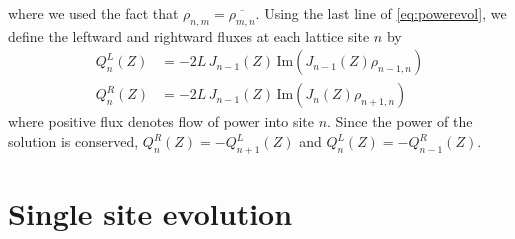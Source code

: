 \documentclass[reprint, amsmath,amssymb,aps,pre]{revtex4-2}
\begin{document}
where we used the fact that $\rho_{n,m} = \overline{\rho_{m,n}}$.
Using the last line of \cref{eq:powerevol}, we define the leftward and rightward fluxes at each lattice site $n$ by
\begin{equation}
\begin{aligned}
Q_n^L(Z) &= -2L\,J_{n-1}(Z)\,\text{Im}\left(J_{n-1}(Z) \rho_{n-1,n} \right) \\
Q_n^R(Z) &= -2L\,J_{n-1}(Z)\,\text{Im}\left(J_n(Z) \rho_{n+1,n} \right) 
\end{aligned}
\end{equation}
where positive flux denotes flow of power into site $n$. Since the power of the solution is conserved, $Q_n^R(Z) = -Q_{n+1}^L(Z)$ and $Q_n^L(Z) = -Q_{n-1}^R(Z)$.

\section{Single site evolution}
\end{document}
